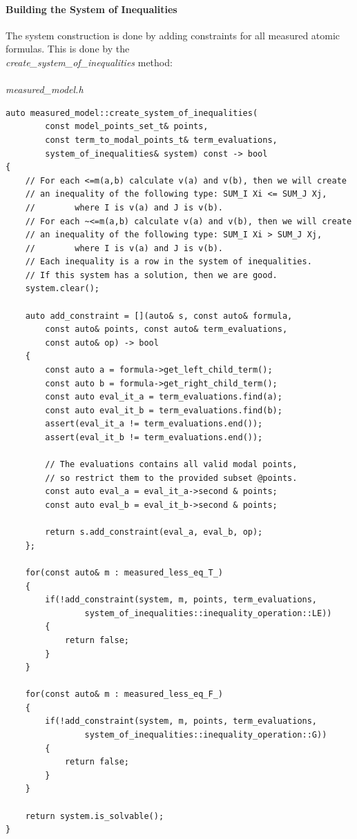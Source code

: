 \documentclass{article}
\begin{document}
	\paragraph{Building the System of Inequalities}
	The system construction is done by adding constraints for all 	
	measured atomic formulas. This is done by the \\
	\textit{create\_system\_of\_inequalities} method:
	\\
	\\
\noindent
\textit{measured\_model.h}
\begin{lstlisting}
auto measured_model::create_system_of_inequalities(
        const model_points_set_t& points,
        const term_to_modal_points_t& term_evaluations,
        system_of_inequalities& system) const -> bool
{
    // For each <=m(a,b) calculate v(a) and v(b), then we will create
    // an inequality of the following type: SUM_I Xi <= SUM_J Xj, 
    //        where I is v(a) and J is v(b).
    // For each ~<=m(a,b) calculate v(a) and v(b), then we will create
    // an inequality of the following type: SUM_I Xi > SUM_J Xj, 
    //        where I is v(a) and J is v(b).
    // Each inequality is a row in the system of inequalities. 
    // If this system has a solution, then we are good.
    system.clear();

    auto add_constraint = [](auto& s, const auto& formula, 
        const auto& points, const auto& term_evaluations,
        const auto& op) -> bool
    {
        const auto a = formula->get_left_child_term();
        const auto b = formula->get_right_child_term();
        const auto eval_it_a = term_evaluations.find(a);
        const auto eval_it_b = term_evaluations.find(b);
        assert(eval_it_a != term_evaluations.end());
        assert(eval_it_b != term_evaluations.end());

        // The evaluations contains all valid modal points, 
        // so restrict them to the provided subset @points.
        const auto eval_a = eval_it_a->second & points;
        const auto eval_b = eval_it_b->second & points;

        return s.add_constraint(eval_a, eval_b, op);
    };

    for(const auto& m : measured_less_eq_T_)
    {
        if(!add_constraint(system, m, points, term_evaluations, 
                system_of_inequalities::inequality_operation::LE))
        {
            return false;
        }
    }

    for(const auto& m : measured_less_eq_F_)
    {
        if(!add_constraint(system, m, points, term_evaluations, 
                system_of_inequalities::inequality_operation::G))
        {
            return false;
        }
    }

    return system.is_solvable();
}
\end{lstlisting}
\end{document}
